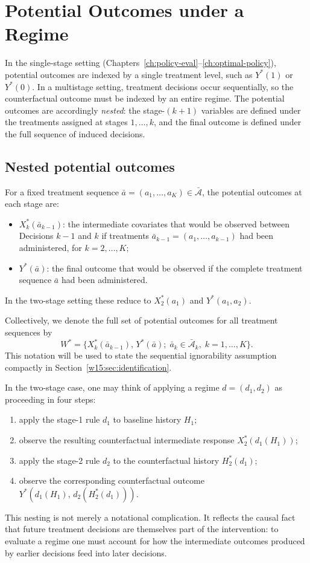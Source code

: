 \documentclass[master.tex]{subfiles}
\begin{document}
\section{Potential Outcomes under a Regime}
\label{w15:sec:counterfactuals}

In the single-stage setting (Chapters~\ref{ch:policy-eval}--\ref{ch:optimal-policy}), potential outcomes are indexed by a single treatment level, such as $Y^*(1)$ or $Y^*(0)$. In a multistage setting, treatment decisions occur sequentially, so the counterfactual outcome must be indexed by an entire regime. The potential outcomes are accordingly \emph{nested}: the stage-$(k+1)$ variables are defined under the treatments assigned at stages $1,\ldots,k$, and the final outcome is defined under the full sequence of induced decisions.

\subsection{Nested potential outcomes}

For a fixed treatment sequence $\bar{a} = (a_1,\ldots,a_K) \in \bar{\mathcal{A}}$, the potential outcomes at each stage are:
\begin{itemize}
  \item $X_k^*(\bar{a}_{k-1})$: the intermediate covariates that would be observed between Decisions $k-1$ and $k$ if treatments $\bar{a}_{k-1} = (a_1,\ldots,a_{k-1})$ had been administered, for $k = 2,\ldots,K$;
  \item $Y^*(\bar{a})$: the final outcome that would be observed if the complete treatment sequence $\bar{a}$ had been administered.
\end{itemize}
In the two-stage setting these reduce to $X_2^*(a_1)$ and $Y^*(a_1,a_2)$.

Collectively, we denote the full set of potential outcomes for all treatment sequences by
\[
W^* = \bigl\{X_k^*(\bar{a}_{k-1}),\, Y^*(\bar{a});\; \bar{a}_k \in \bar{\mathcal{A}}_k,\; k = 1,\ldots,K\bigr\}.
\]
This notation will be used to state the sequential ignorability assumption compactly in Section~\ref{w15:sec:identification}.

In the two-stage case, one may think of applying a regime $d = (d_1, d_2)$ as proceeding in four steps:
\begin{enumerate}
  \item apply the stage-1 rule $d_1$ to baseline history $H_1$;
  \item observe the resulting counterfactual intermediate response $X_2^*(d_1(H_1))$;
  \item apply the stage-2 rule $d_2$ to the counterfactual history $H_2^*(d_1)$;
  \item observe the corresponding counterfactual outcome $Y^*(d_1(H_1),\, d_2(H_2^*(d_1)))$.
\end{enumerate}
This nesting is not merely a notational complication. It reflects the causal fact that future treatment decisions are themselves part of the intervention: to evaluate a regime one must account for how the intermediate outcomes produced by earlier decisions feed into later decisions.
\end{document}

